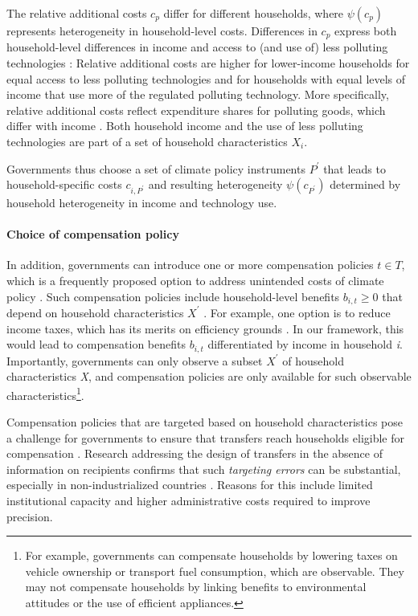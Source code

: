 \documentclass[12pt, a4paper]{article}
\begin{document}
The relative additional costs $c_{p}$ differ for different households, where $\psi(c_{p})$ represents heterogeneity in household-level costs. Differences in $c_{p}$ express both household-level differences in income and access to (and use of) less polluting technologies \autocite{Hansel.2022}: Relative additional costs are higher for lower-income households for equal access to less polluting technologies and for households with equal levels of income that use more of the regulated polluting technology. More specifically, relative additional costs reflect expenditure shares for polluting goods, which differ with income \autocite{Jacobs.2019,Dorband.2019}. Both household income and the use of less polluting technologies are part of a set of household characteristics $X_{i}$. 

Governments thus choose a set of climate policy instruments $P^{\prime}$ that leads to household-specific costs $c_{i,P^{\prime}}$ and resulting heterogeneity $\psi(c_{P^{\prime}})$ determined by household heterogeneity in income and technology use.

\paragraph{Choice of compensation policy}
In addition, governments can introduce one or more compensation policies $t \in T$, which is a frequently proposed option to address unintended costs of climate policy \autocite{Klenert.2018,Baranzini.2017}. Such compensation policies include household-level benefits $b_{i,t}\geq 0$ that depend on household characteristics $X^{\prime}$ \autocite[e.g.,][]{Akerlof.1978}. For example, one option is to reduce income taxes, which has its merits on efficiency grounds \autocite{Pearce.1991,Goulder.1995,Bento.2018}. In our framework, this would lead to compensation benefits $b_{i,t}$ differentiated by income in household \textit{i}. Importantly, governments can only observe a subset $X^{\prime}$ of household characteristics \textit{X}, and compensation policies are only available for such observable characteristics\footnote{For example, governments can compensate households by lowering taxes on vehicle ownership or transport fuel consumption, which are observable. They may not compensate households by linking benefits to environmental attitudes or the use of efficient appliances.}. 

Compensation policies that are targeted based on household characteristics pose a challenge for governments to ensure that transfers reach households eligible for compensation \autocite[e.g.,][]{Hanna.2018}. Research addressing the design of transfers in the absence of information on recipients confirms that such \textit{targeting errors} can be substantial, especially in non-industrialized countries \autocite{WorldBank.2018, Robles.2019,Bah.2019}. Reasons for this include limited institutional capacity \autocite[e.g.,][]{Besley.2009} and higher administrative costs \autocite{Coady.2004} required to improve precision.
\end{document}
